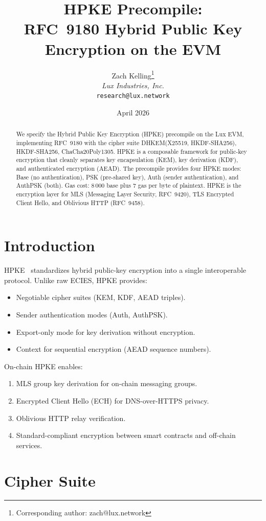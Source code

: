 \documentclass[11pt,a4paper]{article}
\title{HPKE Precompile:\\RFC~9180 Hybrid Public Key Encryption on the EVM}
\author{
Zach Kelling\thanks{Corresponding author: zach@lux.network}\\
\textit{Lux Industries, Inc.}\\
\texttt{research@lux.network}
}
\date{April 2026}
\begin{document}
\luxcoverpage

\begin{abstract}
We specify the Hybrid Public Key Encryption (HPKE) precompile on the Lux EVM,
implementing RFC~9180 with the cipher suite DHKEM(X25519, HKDF-SHA256),
HKDF-SHA256, ChaCha20Poly1305. HPKE is a composable framework for public-key
encryption that cleanly separates key encapsulation (KEM), key derivation (KDF),
and authenticated encryption (AEAD). The precompile provides four HPKE modes:
Base (no authentication), PSK (pre-shared key), Auth (sender authentication),
and AuthPSK (both). Gas cost: 8\,000 base plus 7 gas per byte of plaintext.
HPKE is the encryption layer for MLS (Messaging Layer Security, RFC~9420),
TLS Encrypted Client Hello, and Oblivious HTTP (RFC~9458).
\end{abstract}

\section{Introduction}

HPKE~\cite{rfc9180} standardizes hybrid public-key encryption into a single
interoperable protocol. Unlike raw ECIES, HPKE provides:
\begin{itemize}
  \item Negotiable cipher suites (KEM, KDF, AEAD triples).
  \item Sender authentication modes (Auth, AuthPSK).
  \item Export-only mode for key derivation without encryption.
  \item Context for sequential encryption (AEAD sequence numbers).
\end{itemize}

On-chain HPKE enables:
\begin{enumerate}[label=(\roman*)]
  \item MLS group key derivation for on-chain messaging groups.
  \item Encrypted Client Hello (ECH) for DNS-over-HTTPS privacy.
  \item Oblivious HTTP relay verification.
  \item Standard-compliant encryption between smart contracts and off-chain services.
\end{enumerate}

\section{Cipher Suite}
\end{document}
